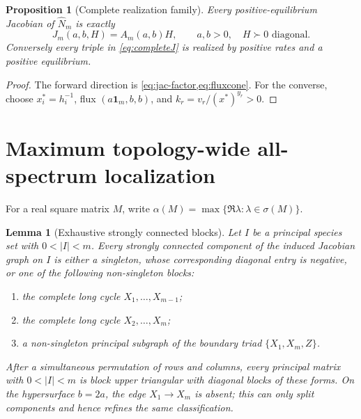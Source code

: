 \documentclass[11pt]{article}
\newtheorem{proposition}[theorem]{Proposition}
\newtheorem{lemma}[theorem]{Lemma}
\theoremstyle{definition}
\newcommand{\1}{\mathbf 1}
\newcommand{\alphaS}{\alpha}
\begin{document}
\begin{proposition}[Complete realization family]\label{prop:realization}
Every positive-equilibrium Jacobian of $\widehat N_m$ is exactly
\begin{equation}\label{eq:completeJ}
 J_m(a,b,H)=A_m(a,b)H,
 \qquad a,b>0,\quad H\succ0\text{ diagonal}.
\end{equation}
Conversely every triple in \eqref{eq:completeJ} is realized by positive rates
and a positive equilibrium.
\end{proposition}

\begin{proof}
The forward direction is \cref{eq:jac-factor,eq:fluxcone}.  For the converse,
choose $x_i^*=h_i^{-1}$, flux $(a\1_m,b,b)$, and
$k_r=v_r/(x^*)^{y_r}>0$.
\end{proof}

\section{Maximum topology-wide all-spectrum localization}

For a real square matrix $M$, write
$\alphaS(M)=\max\{\Re\lambda:\lambda\in\sigma(M)\}$.

\begin{lemma}[Exhaustive strongly connected blocks]\label{lem:scc}
Let $I$ be a principal species set with $0<|I|<m$.  Every strongly connected
component of the induced Jacobian graph on $I$ is either a singleton, whose
corresponding diagonal entry is negative, or one of the following
non-singleton blocks:
\begin{enumerate}[leftmargin=2em]
\item the complete long cycle $X_1,\ldots,X_{m-1}$;
\item the complete long cycle $X_2,\ldots,X_m$;
\item a non-singleton principal subgraph of the boundary triad
$\{X_1,X_m,Z\}$.
\end{enumerate}
After a simultaneous permutation of rows and columns, every principal matrix
with $0<|I|<m$ is block upper triangular with diagonal blocks of these forms.
On the hypersurface $b=2a$, the edge $X_1\to X_m$ is absent; this can only
split components and hence refines the same classification.
\end{lemma}
\end{document}
